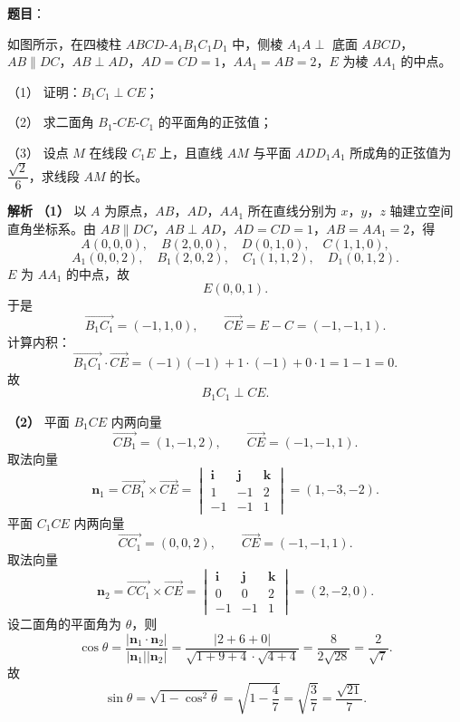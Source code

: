 \begin{answer}

\textbf{题目}：

如图所示，在四棱柱 $ABCD\text{-}A_1B_1C_1D_1$ 中，侧棱 $A_1A\perp$ 底面 $ABCD$，$AB\parallel DC$，$AB\perp AD$，$AD=CD=1$，$AA_1=AB=2$，$E$ 为棱 $AA_1$ 的中点。

（1） 证明：$B_1C_1\perp CE$；

（2） 求二面角 $B_1\text{-}CE\text{-}C_1$ 的平面角的正弦值；

（3） 设点 $M$ 在线段 $C_1E$ 上，且直线 $AM$ 与平面 $ADD_1A_1$ 所成角的正弦值为 $\dfrac{\sqrt2}{6}$，求线段 $AM$ 的长。
\nopagebreak[4]
\begin{center}\end{center}
\nopagebreak[4]
\textbf{解析}
\textbf{（1）} 以 $A$ 为原点，$AB$，$AD$，$AA_1$ 所在直线分别为 $x$，$y$，$z$ 轴建立空间直角坐标系。由 $AB\parallel DC$，$AB\perp AD$，$AD=CD=1$，$AB=AA_1=2$，得
\nopagebreak[4]
\[A(0,0,0),\quad B(2,0,0),\quad D(0,1,0),\quad C(1,1,0),\]
\nopagebreak[4]
\[A_1(0,0,2),\quad B_1(2,0,2),\quad C_1(1,1,2),\quad D_1(0,1,2).\]
$E$ 为 $AA_1$ 的中点，故
\nopagebreak[4]
\[E(0,0,1).\]
于是
\nopagebreak[4]
\[\overrightarrow{B_1C_1}=(-1,1,0),\qquad
\overrightarrow{CE}=E-C=(-1,-1,1).\]
计算内积：
\nopagebreak[4]
\[\overrightarrow{B_1C_1}\cdot\overrightarrow{CE}
=(-1)(-1)+1\cdot(-1)+0\cdot1=1-1=0.\]
故
\nopagebreak[4]
\[B_1C_1\perp CE.\]

\textbf{（2）} 平面 $B_1CE$ 内两向量
\nopagebreak[4]
\[\overrightarrow{CB_1}=(1,-1,2),\qquad
\overrightarrow{CE}=(-1,-1,1).\]
取法向量
\nopagebreak[4]
\[\boldsymbol n_1=\overrightarrow{CB_1}\times\overrightarrow{CE}
=\begin{vmatrix}
\boldsymbol i&\boldsymbol j&\boldsymbol k\\
1&-1&2\\
-1&-1&1
\end{vmatrix}
=(1,-3,-2).\]
平面 $C_1CE$ 内两向量
\nopagebreak[4]
\[\overrightarrow{CC_1}=(0,0,2),\qquad
\overrightarrow{CE}=(-1,-1,1).\]
取法向量
\nopagebreak[4]
\[\boldsymbol n_2=\overrightarrow{CC_1}\times\overrightarrow{CE}
=\begin{vmatrix}
\boldsymbol i&\boldsymbol j&\boldsymbol k\\
0&0&2\\
-1&-1&1
\end{vmatrix}
=(2,-2,0).\]
设二面角的平面角为 $\theta$，则
\nopagebreak[4]
\[\cos\theta
=\frac{|\boldsymbol n_1\cdot\boldsymbol n_2|}{|\boldsymbol n_1||\boldsymbol n_2|}
=\frac{|2+6+0|}{\sqrt{1+9+4}\cdot\sqrt{4+4}}
=\frac{8}{2\sqrt{28}}
=\frac{2}{\sqrt7}.\]
故
\nopagebreak[4]
\[\sin\theta=\sqrt{1-\cos^2\theta}
=\sqrt{1-\frac47}
=\sqrt{\frac37}
=\frac{\sqrt{21}}7.\]


\end{answer}
